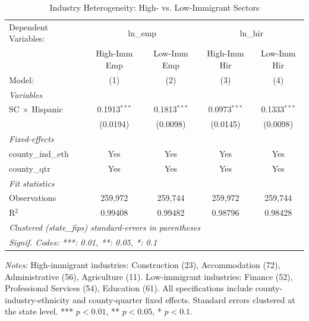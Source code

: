 
\begin{table}[htbp]
   \caption{\label{tab:ind_het} Industry Heterogeneity: High- vs. Low-Immigrant Sectors}
   \centering
   \begin{tabular}{lcccc}
      \tabularnewline \midrule \midrule
      Dependent Variables: & \multicolumn{2}{c}{ln\_emp} & \multicolumn{2}{c}{ln\_hir}\\
                            & High-Imm Emp   & Low-Imm Emp    & High-Imm Hir   & Low-Imm Hir \\   
      Model:                & (1)            & (2)            & (3)            & (4)\\  
      \midrule
      \emph{Variables}\\
      SC $\times$ Hispanic  & 0.1913$^{***}$ & 0.1813$^{***}$ & 0.0973$^{***}$ & 0.1333$^{***}$\\   
                            & (0.0194)       & (0.0098)       & (0.0145)       & (0.0098)\\   
      \midrule
      \emph{Fixed-effects}\\
      county\_ind\_eth      & Yes            & Yes            & Yes            & Yes\\  
      county\_qtr           & Yes            & Yes            & Yes            & Yes\\  
      \midrule
      \emph{Fit statistics}\\
      Observations          & 259,972        & 259,744        & 259,972        & 259,744\\  
      R$^2$                 & 0.99408        & 0.99482        & 0.98796        & 0.98428\\  
      \midrule \midrule
      \multicolumn{5}{l}{\emph{Clustered (state\_fips) standard-errors in parentheses}}\\
      \multicolumn{5}{l}{\emph{Signif. Codes: ***: 0.01, **: 0.05, *: 0.1}}\\
   \end{tabular}
   
   \par \raggedright 
   \textit{Notes:} High-immigrant industries: Construction (23), Accommodation (72), Administrative (56), Agriculture (11). Low-immigrant industries: Finance (52), Professional Services (54), Education (61). All specifications include county-industry-ethnicity and county-quarter fixed effects. Standard errors clustered at the state level. *** $p<0.01$, ** $p<0.05$, * $p<0.1$.
\end{table}


